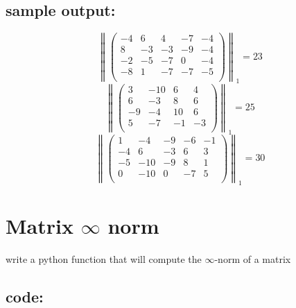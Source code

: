 \documentclass{article}
\begin{document}
	\subsection*{sample output:}
	$$ \left\| \begin{pmatrix}-4 & 6 & 4 & -7 & -4 \\8 & -3 & -3 & -9 & -4 \\-2 & -5 & -7 & 0 & -4 \\-8 & 1 & -7 & -7 & -5 \\\end{pmatrix}\right\|_{1} = 23$$
	$$ \left\| \begin{pmatrix}3 & -10 & 6 & 4 \\6 & -3 & 8 & 6 \\-9 & -4 & 10 & 6 \\5 & -7 & -1 & -3 \\\end{pmatrix}\right\|_{1} = 25$$
	$$ \left\| \begin{pmatrix}1 & -4 & -9 & -6 & -1 \\-4 & 6 & -3 & 6 & 3 \\-5 & -10 & -9 & 8 & 1 \\0 & -10 & 0 & -7 & 5 \\\end{pmatrix}\right\|_{1} = 30$$
	
\section{Matrix $\infty$ norm}
	write a python function that will compute the $\infty$-norm of a matrix
	\subsection*{code:}
	
\end{document}
